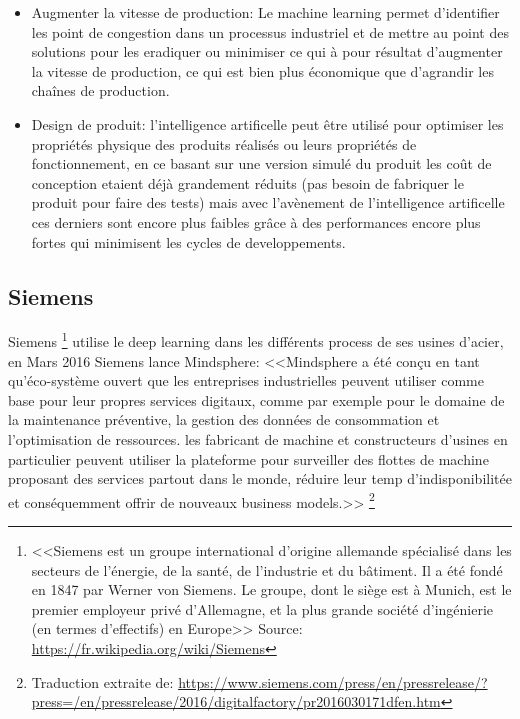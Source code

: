 \begin{itemize}
    \item Augmenter la vitesse de production: Le machine learning permet d'identifier les point 
    de congestion dans un processus industriel et de mettre au point des solutions pour les eradiquer 
    ou minimiser ce qui à pour résultat d'augmenter la vitesse de production, ce qui est bien 
    plus économique que d'agrandir les chaînes de production. \newline 

    \item Design de produit: l'intelligence artificelle peut être utilisé pour optimiser les propriétés 
    physique des produits réalisés ou leurs propriétés de fonctionnement, en ce basant sur une
    version simulé du produit les coût de conception etaient déjà grandement réduits 
    (pas besoin de fabriquer le produit pour faire des tests) mais avec l'avènement de 
    l'intelligence artificelle ces derniers sont encore plus faibles grâce à des performances
    encore plus fortes qui minimisent les cycles de developpements.
    \newline
\end{itemize}

\subsection{Siemens}
Siemens \footnote{<<Siemens est un groupe 
international d’origine allemande spécialisé dans les secteurs de l'énergie, 
de la santé, de l'industrie et du bâtiment. 
Il a été fondé en 1847 par Werner von Siemens. 
Le groupe, dont le siège est à Munich, est le premier employeur privé d'Allemagne, 
et la plus grande société d'ingénierie (en termes d'effectifs) en Europe>> 
Source: \url{https://fr.wikipedia.org/wiki/Siemens}}
utilise le deep learning dans les différents process de ses usines d'acier,
en Mars 2016 Siemens lance Mindsphere: 
<<Mindsphere a été conçu en tant qu'éco-système ouvert que les entreprises industrielles
peuvent utiliser comme base pour leur propres services digitaux, comme par exemple pour 
le domaine de la maintenance préventive, la gestion des données de consommation et 
l'optimisation de ressources. les fabricant de machine et constructeurs d'usines en particulier
peuvent utiliser la plateforme pour surveiller des flottes de machine proposant des
services partout dans le monde, réduire leur temp d'indisponibilitée et 
conséquemment offrir de nouveaux business models.>> 
\footnote{Traduction extraite de: \url{https://www.siemens.com/press/en/pressrelease/?press=/en/pressrelease/2016/digitalfactory/pr2016030171dfen.htm}}
\newline

